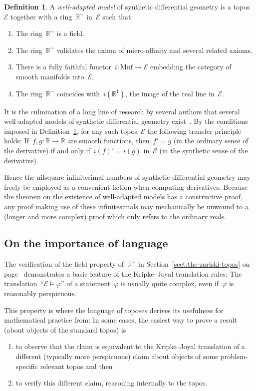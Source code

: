 \documentclass[oneside,reqno]{amsart}
\theoremstyle{definition}
\newtheorem{defn}{Definition}[section]
\theoremstyle{plain}
\theoremstyle{remark}
\newcommand{\E}{\mathcal{E}}
\newcommand{\RR}{\mathbb{R}}
\renewcommand{\_}{\mathpunct{.}\,}
\newcommand{\?}{\,{:}\,}
\begin{document}
\begin{defn}\label{defn:well-adapted}A \emph{well-adapted model} of synthetic
differential geometry is a topos~$\E$ together with a ring~$\RR^\sim$ in~$\E$ such
that:
\begin{enumerate}
\item The ring~$\RR^\sim$ is a field.
\item The ring~$\RR^\sim$ validates the axiom of micro-affinity and several related
axioms.
\item There is a fully faithful functor~$i : \mathrm{Mnf} \to \E$ embedding the
category of smooth manifolds into~$\E$.
\item The ring~$\RR^\sim$ coincides with~$i(\RR^1)$, the image of the real line
in~$\E$.
\end{enumerate}
\end{defn}

It is the culmination of a long line of research by several authors that
several well-adapted models of synthetic differential geometry exist~\cite{moerdijk-reyes:models}. By the
conditions imposed in Definition~\ref{defn:well-adapted}, for any such
topos~$\E$ the following transfer principle holds: If~$f,g : \RR \to \RR$ are
smooth functions, then~$f' = g$ (in the ordinary sense of the derivative) if
and only if~$i(f)' = i(g)$ in~$\E$ (in the synthetic sense of the derivative).

Hence the nilsquare infinitesimal numbers of synthetic differential geometry
may freely be employed as a convenient fiction when computing derivatives.
Because the theorem on the existence of well-adapted models has a constructive
proof, any proof making use of these infinitesimals may mechanically be
unwound to a (longer and more complex) proof which only refers to the ordinary
reals.


\subsection{On the importance of language} The verification of the field
property of~$\RR^\sim$ in Section~\ref{sect:the-zariski-topos} on
page~\pageref{page:field-property} demonstrates a basic feature of the
Kripke--Joyal translation rules: The translation~``$\E \models \varphi$'' of a
statement~$\varphi$ is usually quite complex, even if~$\varphi$ is reasonably
perspicuous.

This property is where the language of toposes derives its usefulness for
mathematical practice from: In some cases, the easiest way to prove a result
(about objects of the standard topos) is
\begin{enumerate}
\item to observe that the claim is
equivalent to the Kripke--Joyal translation of a different (typically more
perspicuous) claim about objects of some problem-specific relevant topos and
then
\item to verify this different claim, reasoning internally to the topos.
\end{enumerate}
\end{document}
